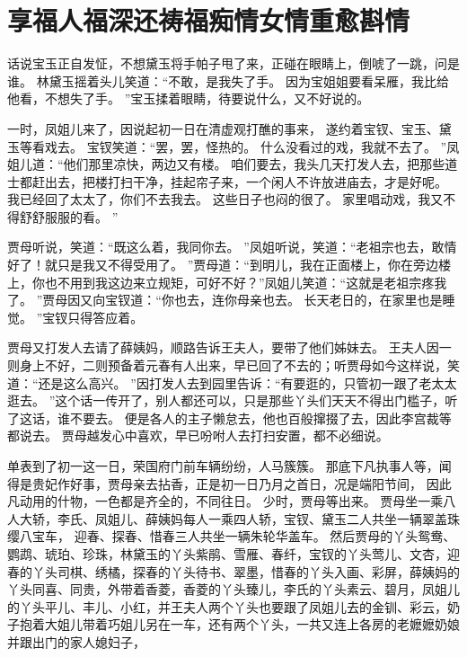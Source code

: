 \chapter{享福人福深还祷福\quad 痴情女情重愈斟情}
\par
话说宝玉正自发怔，不想黛玉将手帕子甩了来，正碰在眼睛上，倒唬了一跳，问是谁。
林黛玉摇着头儿笑道：“不敢，是我失了手。
因为宝姐姐要看呆雁，我比给他看，不想失了手。
”宝玉揉着眼睛，待要说什么，又不好说的。
\par
一时，凤姐儿来了，因说起初一日在清虚观打醮的事来，
遂约着宝钗、宝玉、黛玉等看戏去。
宝钗笑道：“罢，罢，怪热的。
什么没看过的戏，我就不去了。
”凤姐儿道：“他们那里凉快，两边又有楼。
咱们要去，我头几天打发人去，把那些道士都赶出去，把楼打扫干净，挂起帘子来，一个闲人不许放进庙去，才是好呢。
我已经回了太太了，你们不去我去。
这些日子也闷的很了。
家里唱动戏，我又不得舒舒服服的看。
”\par
贾母听说，笑道：“既这么着，我同你去。
”凤姐听说，笑道：“老祖宗也去，敢情好了！就只是我又不得受用了。
”贾母道：“到明儿，我在正面楼上，你在旁边楼上，你也不用到我这边来立规矩，可好不好？”凤姐儿笑道：“这就是老祖宗疼我了。
”贾母因又向宝钗道：“你也去，连你母亲也去。
长天老日的，在家里也是睡觉。
”宝钗只得答应着。
\par
贾母又打发人去请了薛姨妈，顺路告诉王夫人，要带了他们姊妹去。
王夫人因一则身上不好，二则预备着元春有人出来，早已回了不去的；听贾母如今这样说，笑道：“还是这么高兴。
”因打发人去到园里告诉：“有要逛的，只管初一跟了老太太逛去。
”这个话一传开了，别人都还可以，只是那些丫头们天天不得出门槛子，听了这话，谁不要去。
便是各人的主子懒怠去，他也百般撺掇了去，因此李宫裁等都说去。
贾母越发心中喜欢，早已吩咐人去打扫安置，都不必细说。
\par
单表到了初一这一日，荣国府门前车辆纷纷，人马簇簇。
那底下凡执事人等，闻得是贵妃作好事，贾母亲去拈香，正是初一日乃月之首日，况是端阳节间，
因此凡动用的什物，一色都是齐全的，不同往日。
少时，贾母等出来。
贾母坐一乘八人大轿，李氏、凤姐儿、薛姨妈每人一乘四人轿，宝钗、黛玉二人共坐一辆翠盖珠缨八宝车，
迎春、探春、惜春三人共坐一辆朱轮华盖车。
然后贾母的丫头鸳鸯、鹦鹉、琥珀、珍珠，林黛玉的丫头紫鹃、雪雁、春纤，宝钗的丫头莺儿、文杏，迎春的丫头司棋、绣橘，探春的丫头待书、翠墨，惜春的丫头入画、彩屏，薛姨妈的丫头同喜、同贵，外带着香菱，香菱的丫头臻儿，李氏的丫头素云、碧月，凤姐儿的丫头平儿、丰儿、小红，并王夫人两个丫头也要跟了凤姐儿去的金钏、彩云，奶子抱着大姐儿带着巧姐儿另在一车，还有两个丫头，一共又连上各房的老嬷嬷奶娘并跟出门的家人媳妇子，
